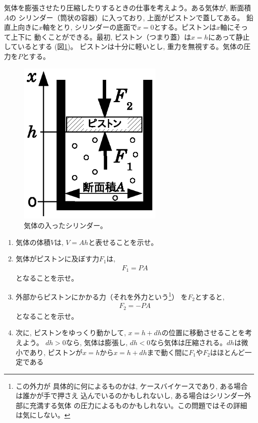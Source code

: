 %
\begin{q}\label{q:gas_work}
気体を膨張させたり圧縮したりするときの仕事を考えよう。ある気体が, 断面積$A$の
シリンダー（筒状の容器）に入っており, 上面がピストンで蓋してある。
鉛直上向きに$x$軸をとり, シリンダーの底面で$x=0$とする。ピストンは$x$軸にそって上下に
動くことができる。最初, ピストン（つまり蓋）は$x=h$にあって静止しているとする
(図\ref{fig:gas_piston})。
ピストンは十分に軽いとし, 重力を無視する。気体の圧力を$P$とする。
\begin{figure}[h]
    \centering
    \includegraphics[width=7cm]{gas_piston.eps}
    \caption{気体の入ったシリンダー。}\label{fig:gas_piston}
\end{figure}
\begin{enumerate}
\item 気体の体積$V$は, $V=Ah$と表せることを示せ。
\item 気体がピストンに及ぼす力$F_1$は, 
\begin{eqnarray}F_1=PA\label{eq:gas_work1}\end{eqnarray}
となることを示せ。
\item 外部からピストンにかかる力（それを外力という\footnote{この外力が
具体的に何によるものかは, ケースバイケースであり, ある場合は誰かが手で押さえ
込んでいるのかもしれないし, ある場合はシリンダー外部に充満する気体
の圧力によるものかもしれない。この問題ではその詳細は気にしない。}）
を$F_2$とすると, 
\begin{eqnarray}F_2=-PA\label{eq:gas_work2}\end{eqnarray}
となることを示せ。
\item 次に, ピストンをゆっくり動かして, $x=h+dh$の位置に移動させることを考えよう。
$dh>0$なら, 気体は膨張し, $dh<0$なら気体は圧縮される。$dh$は微小であり, 
ピストンが$x=h$から$x=h+dh$まで動く間に$F_1$や$F_2$はほとんど一定である

\end{enumerate}
\end{q}
